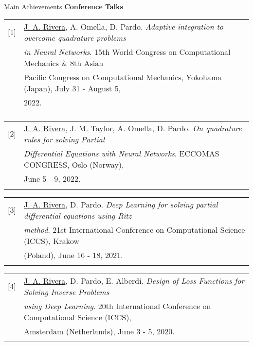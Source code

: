 \begin{frame}{Main Achievements}
\textbf{Conference Talks}
\vspace{0.2cm}

\begin{small}
\begin{tabular}{rl}
[1]&\underline{J. A. Rivera}, A. Omella, D. Pardo. \textit{Adaptive integration to overcome quadrature problems} \\
& \textit{in Neural Networks}. 15th World Congress on Computational Mechanics \& 8th Asian \\
& Pacific Congress on Computational Mechanics, Yokohama (Japan), July 31 - August 5, \\
& 2022.\\\\
\end{tabular}

\begin{tabular}{rl}
[2]& \underline{J. A. Rivera}, J. M. Taylor, A. Omella, D. Pardo. \textit{On quadrature rules for solving Partial} \\
& \textit{Differential Equations with Neural Networks}. ECCOMAS CONGRESS, Oslo (Norway), \\
& June 5 - 9, 2022.\\\\
\end{tabular}

\begin{tabular}{rl}
[3]& \underline{J. A. Rivera}, D. Pardo. \textit{Deep Learning for solving partial differential equations using Ritz} \\
& \textit{method}. 21st International Conference on Computational Science (ICCS), Krakow \\
& (Poland), June 16 - 18, 2021.\\\\
\end{tabular}

\begin{tabular}{rl}
[4]& \underline{J. A. Rivera}, D. Pardo, E. Alberdi. \textit{Design of Loss Functions for Solving Inverse Problems} \\
& \textit{using Deep Learning}. 20th International Conference on Computational Science (ICCS), \\
& Amsterdam (Netherlands), June 3 - 5, 2020.\\\\
\end{tabular}
\end{small}

\end{frame}


